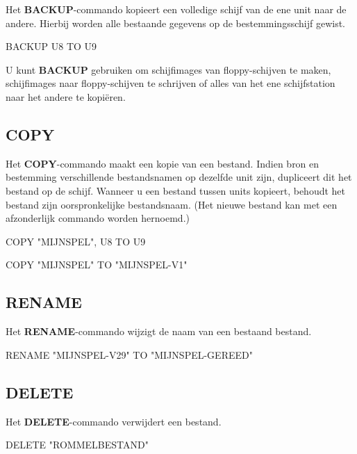 Het {\bf BACKUP}-commando kopieert een volledige schijf van de ene unit naar de andere. Hierbij worden alle bestaande gegevens op de bestemmingsschijf gewist.

\begin{screencode}
BACKUP U8 TO U9
\end{screencode}

U kunt {\bf BACKUP} gebruiken om schijfimages van floppy-schijven te maken, schijfimages naar floppy-schijven te schrijven of alles van het ene schijfstation naar het andere te kopiëren.

\subsection{COPY}

Het {\bf COPY}-commando maakt een kopie van een bestand. Indien bron en bestemming verschillende bestandsnamen op dezelfde unit zijn, dupliceert dit het bestand op de schijf. Wanneer u een bestand tussen units kopieert, behoudt het bestand zijn oorspronkelijke bestandsnaam. (Het nieuwe bestand kan met een afzonderlijk commando worden hernoemd.)

\begin{screencode}
COPY "MIJNSPEL", U8 TO U9

COPY "MIJNSPEL" TO "MIJNSPEL-V1"
\end{screencode}

\subsection{RENAME}

Het {\bf RENAME}-commando wijzigt de naam van een bestaand bestand.

\begin{screencode}
RENAME "MIJNSPEL-V29" TO "MIJNSPEL-GEREED"
\end{screencode}

\subsection{DELETE}

Het {\bf DELETE}-commando verwijdert een bestand.

\begin{screencode}
DELETE "ROMMELBESTAND"
\end{screencode}


